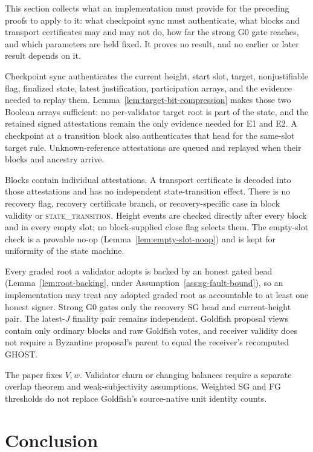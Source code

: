 This section collects what an implementation must provide for the preceding
proofs to apply to it: what checkpoint sync must authenticate, what blocks and
transport certificates may and may not do, how far the strong G0 gate reaches,
and which parameters are held fixed.  It proves no result, and no earlier or
later result depends on it.

Checkpoint sync authenticates the current height, start slot, target,
nonjustifiable flag, finalized state, latest justification, participation
arrays, and the evidence needed to replay them.
Lemma~\ref{lem:target-bit-compression} makes those two Boolean arrays
sufficient: no per-validator target root is part of the state, and the retained
signed attestations remain the only evidence needed for E1 and E2.  A checkpoint
at a transition block also authenticates that head for the same-slot target
rule.  Unknown-reference attestations are queued and replayed when their
blocks and ancestry arrive.

Blocks contain individual attestations.  A transport certificate is decoded
into those attestations and has no independent state-transition effect.
There is no recovery flag, recovery certificate branch, or
recovery-specific case in block validity or
\textsc{state\_transition}.  Height events are checked directly after every
block and in every empty slot; no block-supplied close flag selects them.
The empty-slot check is a provable no-op (Lemma~\ref{lem:empty-slot-noop})
and is kept for uniformity of the state machine.

Every graded root a validator adopts is backed by an honest gated head
(Lemma~\ref{lem:root-backing}, under
Assumption~\ref{ass:sg-fault-bound}), so an implementation may treat any
adopted graded root as accountable to at least one honest signer.
Strong G0 gates only the recovery SG head and current-height pair.  The
latest-\(J\) finality pair remains independent.  Goldfish proposal views
contain only ordinary blocks and raw Goldfish votes, and receiver validity
does not require a Byzantine proposal's parent to equal the receiver's
recomputed GHOST.

The paper fixes \(V,w\).  Validator churn or changing balances require a
separate overlap theorem and weak-subjectivity assumptions.  Weighted SG and
FG thresholds do not replace Goldfish's source-native unit identity counts.

\section{Conclusion}\label{sec:conclusion}

